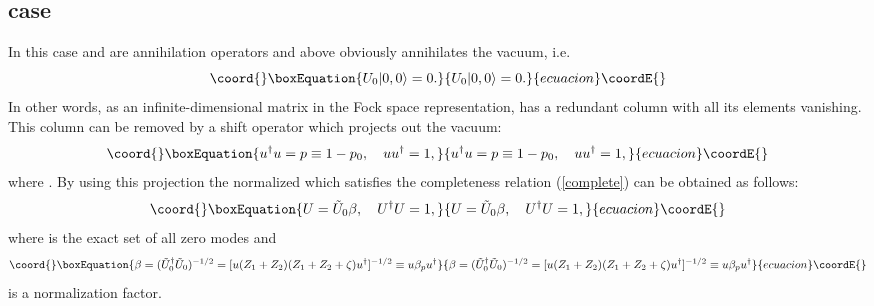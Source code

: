 \documentclass[a4paper,a4paper]{article}
\begin{document}
\subsection{\coordHE{} case}
In this case \coordHE{} and \coordHE{} are annihilation operators
and  \coordHE{} above obviously annihilates the vacuum, i.e.
\begin{equation}\coord{}\boxEquation{
U_0|0,0\rangle=0.
}{
U_0|0,0\rangle=0.
}{ecuacion}\coordE{}\end{equation}
In other words, as an infinite-dimensional matrix in the Fock space
representation, \coordHE{} has a redundant column with all its elements
vanishing. This column can be removed by a shift operator \coordHE{}
which projects out the vacuum:
\begin{equation}\coord{}\boxEquation{
u^\dag u=p\equiv 1-p_0,\quad uu^\dag=1,
}{
u^\dag u=p\equiv 1-p_0,\quad uu^\dag=1,
}{ecuacion}\coordE{}\end{equation}
where \coordHE{}. By using this projection the
normalized \coordHE{} which satisfies the completeness relation
(\ref{complete}) can be obtained as follows:
\begin{equation}\coord{}\boxEquation{
U=\tilde U_0\beta,\quad U^\dag U=1,
}{
U=\tilde U_0\beta,\quad U^\dag U=1,
}{ecuacion}\coordE{}\end{equation}
where \coordHE{} is the exact set of all zero modes
and
\begin{equation}\coord{}\boxEquation{
\beta=(\tilde U_0^\dag \tilde U_0)^{-1/2}=[u(Z_1+Z_2)(Z_1+Z_2
+\zeta)u^\dag]^{-1/2}\equiv u\beta_p u^\dag
}{
\beta=(\tilde U_0^\dag \tilde U_0)^{-1/2}=[u(Z_1+Z_2)(Z_1+Z_2
+\zeta)u^\dag]^{-1/2}\equiv u\beta_p u^\dag
}{ecuacion}\coordE{}\end{equation}
is a normalization factor.
\end{document}
